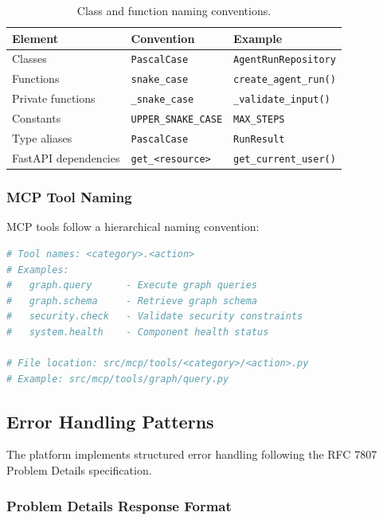 \begin{table}[ht]
\centering
\caption{Class and function naming conventions.}
\label{tab:class-naming}
\small
\begin{tabular}{lll}
\hline
\textbf{Element} & \textbf{Convention} & \textbf{Example} \\
\hline
Classes & \texttt{PascalCase} & \texttt{AgentRunRepository} \\
Functions & \texttt{snake\_case} & \texttt{create\_agent\_run()} \\
Private functions & \texttt{\_snake\_case} & \texttt{\_validate\_input()} \\
Constants & \texttt{UPPER\_SNAKE\_CASE} & \texttt{MAX\_STEPS} \\
Type aliases & \texttt{PascalCase} & \texttt{RunResult} \\
FastAPI dependencies & \texttt{get\_<resource>} & \texttt{get\_current\_user()} \\
\hline
\end{tabular}
\end{table}

\subsubsection{MCP Tool Naming}

MCP tools follow a hierarchical naming convention:

\begin{lstlisting}[language=Python, caption={MCP tool naming pattern.}]
# Tool names: <category>.<action>
# Examples:
#   graph.query      - Execute graph queries
#   graph.schema     - Retrieve graph schema
#   security.check   - Validate security constraints
#   system.health    - Component health status

# File location: src/mcp/tools/<category>/<action>.py
# Example: src/mcp/tools/graph/query.py
\end{lstlisting}

\subsection{Error Handling Patterns}

The platform implements structured error handling following the RFC 7807 Problem Details specification.

\subsubsection{Problem Details Response Format}

